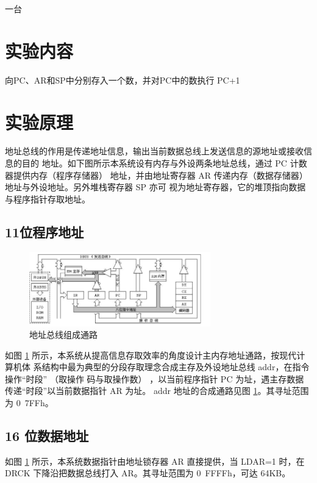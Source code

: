 \documentclass[a4paper,10pt,UTF8]{paper}
\numberwithin{equation}{section}
\numberwithin{figure}{section}
\begin{document}
\dai 一台

\section{实验内容}

向PC、AR和SP中分别存入一个数，并对PC中的数执行 PC+1

\section{实验原理}

地址总线的作用是传递地址信息，输出当前数据总线上发送信息的源地址或接收信息的目的 地址。如下图所示本系统设有内存与外设两条地址总线，通过 PC 计数器提供内存（程序存储器） 地址，并由地址寄存器 AR 传递内存（数据存储器）地址与外设地址。另外堆栈寄存器 SP 亦可 视为地址寄存器，它的堆顶指向数据与程序指针存取地址。

\subsection{11位程序地址}

\begin{figure}[h]
  \centering
  \includegraphics[width=0.7\textwidth]{1.PNG}
  \caption{地址总线组成通路}
  \label{fig:1}
\end{figure}

如图 \ref{fig:1} 所示，本系统从提高信息存取效率的角度设计主内存地址通路，按现代计算机体 系结构中最为典型的分段存取理念合成主存及外设地址总线 addr，在指令操作“时段” （取操作 码与取操作数） ，以当前程序指针 PC 为址，遇主存数据传递“时段”以当前数据指针 AR 为址。 addr 地址的合成通路见图 \ref{fig:1}。其寻址范围为 0~7FFh。

\subsection{16 位数据地址}

如图 \ref{fig:1} 所示，本系统数据指针由地址锁存器 AR 直接提供，当 LDAR=1 时，在 DRCK 下降沿把数据总线打入 AR。其寻址范围为 0~FFFFh，可达 64KB。
\end{document}
